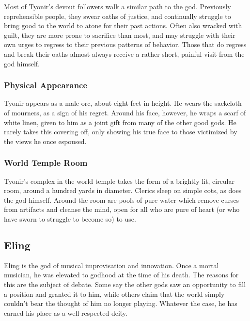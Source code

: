 Most of Tyonir's devout followers walk a similar path to the god.
Previously reprehensible people, they swear oaths of justice, and continually struggle to bring good to the world to atone for their past actions.
Often also wracked with guilt, they are more prone to sacrifice than most, and may struggle with their own urges to regress to their previous patterns of behavior.
Those that do regress and break their oaths almost always receive a rather short, painful visit from the god himself.

\subsubsection*{Physical Appearance}
Tyonir appears as a male orc, about eight feet in height.
He wears the sackcloth of mourners, as a sign of his regret.
Around his face, however, he wraps a scarf of white linen, given to him as a joint gift from many of the other good gods.
He rarely takes this covering off, only showing his true face to those victimized by the views he once espoused.

\subsubsection*{World Temple Room}
Tyonir's complex in the world temple takes the form of a brightly lit, circular room, around a hundred yards in diameter.
Clerics sleep on simple cots, as does the god himself.
Around the room are pools of pure water which remove curses from artifacts and cleanse the mind, open for all who are pure of heart (or who have sworn to struggle to become so) to use.


\subsection*{Eling}
\begin{goddesc}
\end{goddesc}

Eling is the god of musical improvisation and innovation.
Once a mortal musician, he was elevated to godhood at the time of his death.
The reasons for this are the subject of debate.
Some say the other gods saw an opportunity to fill a position and granted it to him, while others claim that the world simply couldn't bear the thought of him no longer playing.
Whatever the case, he has earned his place as a well-respected deity.

